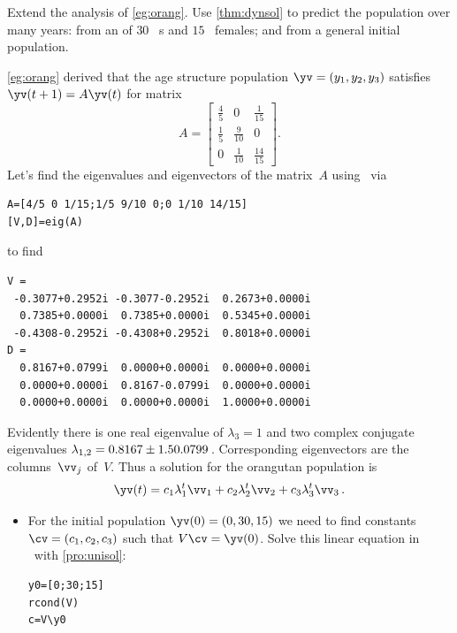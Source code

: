 \begin{example} \label{eg:orangs}
Extend the  analysis of \autoref{eg:orang}. 
Use \autoref{thm:dynsol} to predict the population over many years: from an  of \(30\)~ s and \(15\)~ females; and from a general initial population.
\begin{solution} 
\autoref{eg:orang} derived that the age structure population \(\yv=(y_1,y_2,y_3)\) satisfies \(\yv(t+1)=A\yv(t)\) for matrix
\begin{equation*}
A=\begin{bmatrix} \frac45&0&\frac1{15}
\\\frac15&\frac9{10}&0
\\0&\frac1{10}&\frac{14}{15} \end{bmatrix}.
\end{equation*}
Let's find the eigenvalues and eigenvectors of the matrix~\(A\) using \script\ via
\begin{verbatim}
A=[4/5 0 1/15;1/5 9/10 0;0 1/10 14/15]
[V,D]=eig(A)
\end{verbatim}
\setbox\ajrqrbox\hbox{}%
\marginajrbox%
to find
\begin{verbatim}
V =
 -0.3077+0.2952i -0.3077-0.2952i  0.2673+0.0000i
  0.7385+0.0000i  0.7385+0.0000i  0.5345+0.0000i
 -0.4308-0.2952i -0.4308+0.2952i  0.8018+0.0000i
D =
  0.8167+0.0799i  0.0000+0.0000i  0.0000+0.0000i
  0.0000+0.0000i  0.8167-0.0799i  0.0000+0.0000i
  0.0000+0.0000i  0.0000+0.0000i  1.0000+0.0000i
\end{verbatim}
Evidently there is one real eigenvalue of \(\lambda_3=1\) and two complex conjugate eigenvalues \(\lambda_{1,2}=0.8167\pm 1.50.0799\)\,.
Corresponding eigenvectors are the columns~\(\vv_j\) of~\(V\).
Thus a solution for the orangutan population is
\begin{equation*}
\yv(t)=c_1\lambda_1^t\vv_1+c_2\lambda_2^t\vv_2+c_3\lambda_3^t\vv_3\,.
\end{equation*}
\begin{itemize}
\item For the initial population \(\yv(0)=(0,30,15)\) we need to find constants \(\cv=(c_1,c_2,c_3)\) such that \(V\cv=\yv(0)\).
Solve this linear equation in \script\ with \autoref{pro:unisol}:
\begin{verbatim}
y0=[0;30;15]
rcond(V)
c=V\y0
\end{verbatim}

\end{itemize}
\end{solution}
\end{example}
